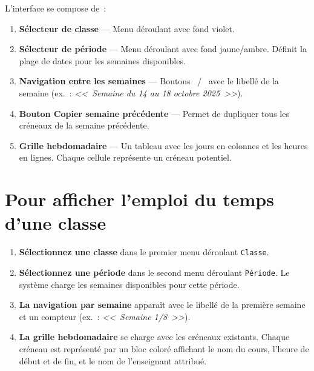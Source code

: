 \documentclass[12pt,a4paper]{report}
\newcommand{\champ}[1]{\texttt{\color{violet}#1}}
\begin{document}
L'interface se compose de~:

\begin{enumerate}[leftmargin=1.2cm]
  \item \textbf{S\'electeur de classe} --- Menu d\'eroulant avec fond violet.
  \item \textbf{S\'electeur de p\'eriode} --- Menu d\'eroulant avec fond jaune/ambre. D\'efinit la plage de dates pour les semaines disponibles.
  \item \textbf{Navigation entre les semaines} --- Boutons \faChevronLeft\ / \faChevronRight\ avec le libell\'e de la semaine (ex.\ : \textit{<<~Semaine du 14 au 18 octobre 2025~>>}).
  \item \textbf{Bouton Copier semaine pr\'ec\'edente} --- Permet de dupliquer tous les cr\'eneaux de la semaine pr\'ec\'edente.
  \item \textbf{Grille hebdomadaire} --- Un tableau avec les jours en colonnes et les heures en lignes. Chaque cellule repr\'esente un cr\'eneau potentiel.
\end{enumerate}

\section{Pour afficher l'emploi du temps d'une classe}

\begin{etape}[title=Proc\'edure : Charger l'emploi du temps]
\begin{enumerate}[leftmargin=1.5cm,label=\textbf{\arabic*.},itemsep=12pt]
  \item \textbf{S\'electionnez une classe} dans le premier menu d\'eroulant \champ{Classe}.

  \item \textbf{S\'electionnez une p\'eriode} dans le second menu d\'eroulant \champ{P\'eriode}. Le syst\`eme charge les semaines disponibles pour cette p\'eriode.

  \item \textbf{La navigation par semaine} appara\^it avec le libell\'e de la premi\`ere semaine et un compteur (ex.\ : \textit{<<~Semaine 1/8~>>}).

  \item \textbf{La grille hebdomadaire} se charge avec les cr\'eneaux existants. Chaque cr\'eneau est repr\'esent\'e par un bloc color\'e affichant le nom du cours, l'heure de d\'ebut et de fin, et le nom de l'enseignant attribu\'e.
\end{enumerate}
\end{etape}
\end{document}
